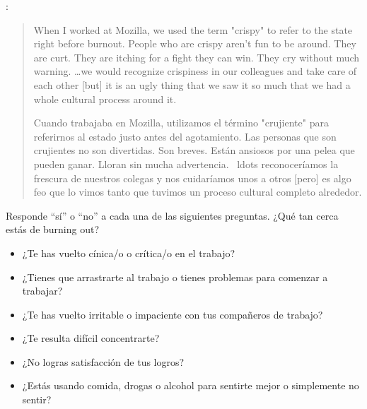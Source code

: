 
:

\begin{quote}
  When I worked at Mozilla,
  we used the term "crispy" to refer to the state right before burnout.
  People who are crispy aren't fun to be around.
  They are curt.
  They are itching for a fight they can win.
  They cry without much warning.
  {\ldots}we would recognize crispiness in our colleagues and take care of each other
  [but] it is an ugly thing that we saw it so much that we had a whole cultural process around it.
  
  Cuando trabajaba en Mozilla, utilizamos el término "crujiente" para referirnos al estado justo antes del agotamiento.
  Las personas que son crujientes no son divertidas.
  Son breves.
  Están ansiosos por una pelea que pueden ganar.
  Lloran sin mucha advertencia.
  {\ ldots} reconoceríamos la frescura de nuestros colegas y nos cuidaríamos unos a otros [pero] es algo feo que lo vimos tanto que tuvimos un proceso cultural completo alrededor.
\end{quote}

\noindent
Responde ``sí'' o ``no'' a cada una de las siguientes preguntas.
¿Qué tan cerca estás de burning out?

\begin{itemize}
\item ¿Te has vuelto cínica/o o crítica/o en el trabajo?
\item ¿Tienes que arrastrarte al trabajo o tienes problemas para comenzar a trabajar?
\item ¿Te has vuelto irritable o impaciente con tus compañeros de trabajo?
\item ¿Te resulta difícil concentrarte?
\item ¿No logras satisfacción de tus logros?
\item ¿Estás usando comida, drogas o alcohol para sentirte mejor o simplemente no sentir?
\end{itemize}

